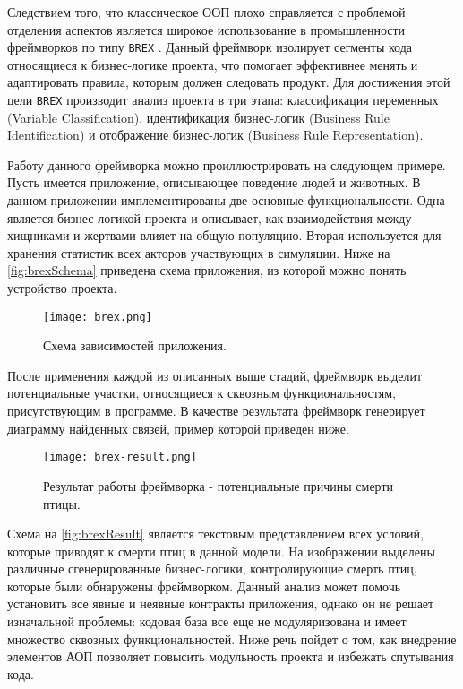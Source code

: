 Следствием того, что классическое ООП плохо справляется с проблемой отделения аспектов является широкое использование в промышленности фреймворков по типу \texttt{BREX} \cite{brex}. Данный фреймворк изолирует сегменты кода относящиеся к бизнес-логике проекта, что помогает эффективнее менять и адаптировать правила, которым должен следовать продукт. Для достижения этой цели \texttt{BREX} производит анализ проекта в три этапа: классификация переменных (Variable Classification), идентификация бизнес-логик (Business Rule Identification) и отображение бизнес-логик (Business Rule Representation).

Работу данного фреймворка можно проиллюстрировать на следующем примере. Пусть имеется приложение, описывающее поведение людей и животных. В данном приложении имплементированы две основные функциональности. Одна является бизнес-логикой проекта и описывает, как взаимодействия между хищниками и жертвами влияет на общую популяцию. Вторая используется для хранения статистик всех акторов участвующих в симуляции. Ниже на \autoref{fig:brexSchema} приведена схема приложения, из которой можно понять устройство проекта.

\begin{figure}[h]
\centering
\texttt{[image: brex.png]}
\caption{Схема зависимостей приложения.}
\label{fig:brexSchema}
\end{figure}

После применения каждой из описанных выше стадий, фреймворк выделит потенциальные участки, относящиеся к сквозным функциональностям, присутствующим в программе. В качестве результата фреймворк генерирует диаграмму найденных связей, пример которой приведен ниже.

\begin{figure}[h]
\centering
\texttt{[image: brex-result.png]}
\caption{Результат работы фреймворка - потенциальные причины смерти птицы.}
\label{fig:brexResult}
\end{figure}

Схема на \autoref{fig:brexResult} является текстовым представлением всех условий, которые приводят к смерти птиц в данной модели. На изображении выделены различные сгенерированные бизнес-логики, контролирующие смерть птиц, которые были обнаружены фреймворком. Данный анализ может помочь установить все явные и неявные контракты приложения, однако он не решает изначальной проблемы: кодовая база все еще не модуляризована и имеет множество сквозных функциональностей. Ниже речь пойдет о том, как внедрение элементов АОП позволяет повысить модульность проекта и избежать спутывания кода.


